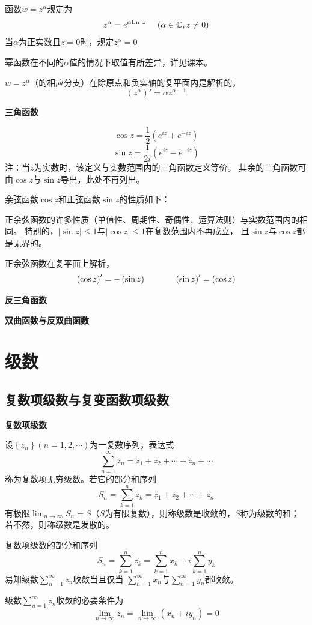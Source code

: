 \documentclass[a4paper,12pt]{article}
\begin{document}
函数$w=z^\alpha$规定为
$$
z^\alpha=e^{\alpha\text{Ln}\ z}\kern 12pt\left(\alpha\in\mathbb{C},z\ne0\right)
$$
当$\alpha$为正实数且$z=0$时，规定$z^\alpha=0$

幂函数在不同的$\alpha$值的情况下取值有所差异，详见课本。

$w=z^\alpha$（的相应分支）在除原点和负实轴的复平面内是解析的，
$$
\left(z^\alpha\right)'=\alpha z^{\alpha-1}
$$

\noindent
\textbf{三角函数}

$$
\cos z=\frac12\left(e^{iz}+e^{-iz}\right)
$$
$$
\sin z=\frac1{2i}\left(e^{iz}-e^{-iz}\right)
$$
注：当$z$为实数时，该定义与实数范围内的三角函数定义等价。
其余的三角函数可由$\cos z$与$\sin z$导出，此处不再列出。

余弦函数$\cos z$和正弦函数$\sin z$的性质如下：

正余弦函数的许多性质（单值性、周期性、奇偶性、运算法则）与实数范围内的相同。
特别的，$\left|\sin z\right|\le1$与$\left|\cos z\right|\le1$在复数范围内不再成立，
且$\sin z$与$\cos z$都是无界的。

正余弦函数在复平面上解析，
$$
\left(\cos z\right)'=-\left(\sin z\right)\kern 36pt
\left(\sin z\right)'=\left(\cos z\right)
$$

\noindent
\textbf{反三角函数}

\noindent
\textbf{双曲函数与反双曲函数}

\section{级数}

\subsection{复数项级数与复变函数项级数}

\noindent
\textbf{复数项级数}

设$\left\{z_n\right\}\left(n=1,2,\cdots\right)$为一复数序列，表达式
$$
\sum_{n=1}^\infty z_n=z_1+z_2+\cdots+z_n+\cdots
$$
称为复数项无穷级数。若它的部分和序列
$$
S_n=\sum_{k=1}^n z_k=z_1+z_2+\cdots+z_n
$$
有极限$\lim_{n\to\infty}S_n=S$（$S$为有限复数），则称级数是收敛的，$S$称为级数的和；
若不然，则称级数是发散的。

复数项级数的部分和序列
$$
S_n=\sum_{k=1}^n z_k=\sum_{k=1}^n x_k+i\sum_{k=1}^n y_k
$$
易知级数$\sum_{n=1}^\infty z_n$收敛当且仅当
$\sum_{n=1}^\infty x_n$与$\sum_{n=1}^\infty y_n$都收敛。

级数$\sum_{n=1}^\infty z_n$收敛的必要条件为
$$
\lim_{n\to\infty}z_n=\lim_{n\to\infty}\left(x_n+iy_n\right)=0
$$
\end{document}
